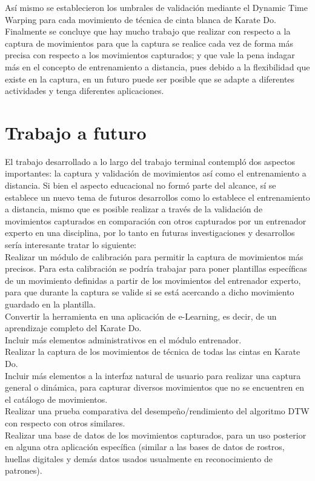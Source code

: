 Así mismo se establecieron los umbrales de validación mediante el Dynamic Time Warping para cada movimiento de técnica de cinta blanca de Karate Do.\\

Finalmente se concluye que hay mucho trabajo que realizar con respecto a la captura de movimientos para que la captura se realice cada vez de forma más precisa con respecto a los movimientos capturados; y que vale la pena indagar más en el concepto de entrenamiento a distancia, pues debido a la flexibilidad que existe en la captura, en un futuro puede ser posible que se adapte a diferentes actividades y tenga diferentes aplicaciones.\\

\chapter{Trabajo a futuro}

El trabajo desarrollado a lo largo del trabajo terminal contempló dos aspectos importantes: la captura y validación de movimientos así como el entrenamiento a distancia. Si bien el aspecto educacional no formó parte del alcance, sí se establece un nuevo tema de futuros desarrollos como lo establece el entrenamiento a distancia, mismo que es posible realizar a través de la validación de movimientos capturados en comparación con otros capturados por un entrenador experto en una disciplina, por lo tanto en futuras investigaciones y desarrollos sería interesante tratar lo siguiente:\\

Realizar un módulo de calibración para permitir la captura de movimientos más precisos. Para esta calibración se podría trabajar para poner plantillas específicas de un movimiento definidas a partir de los movimientos del entrenador experto, para que durante la captura se valide si se está acercando a dicho movimiento guardado en la plantilla.\\

Convertir la herramienta en una aplicación de e-Learning, es decir, de un aprendizaje completo del Karate Do.\\

Incluir más elementos administrativos en el módulo entrenador.\\

Realizar la captura de los movimientos de técnica de todas las cintas en Karate Do.\\

Incluir más elementos a la interfaz natural de usuario para realizar una captura general o dinámica, para capturar diversos movimientos que no se encuentren en el catálogo de movimientos.\\

Realizar una prueba comparativa del desempeño/rendimiento del algoritmo DTW con respecto con otros similares. \\

Realizar una base de datos de los movimientos capturados, para un uso posterior en alguna otra aplicación específica (similar a las bases de datos de rostros, huellas digitales y demás datos usados usualmente en reconocimiento de patrones).\\